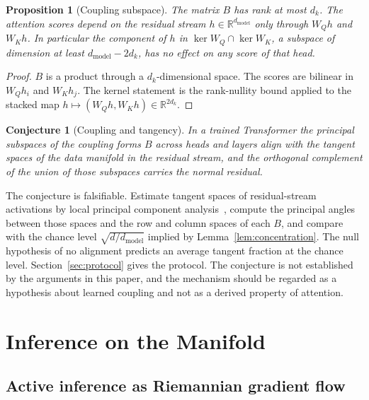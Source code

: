 \documentclass[11pt,a4paper]{article}
\newtheorem{proposition}[theorem]{Proposition}
\newtheorem{conjecture}[theorem]{Conjecture}
\theoremstyle{definition}
\theoremstyle{remark}
\newcommand{\R}{\mathbb{R}}
\begin{document}
\begin{proposition}[Coupling subspace]\label{prop:coupling}
The matrix $B$ has rank at most $d_k$. The attention scores depend on the
residual stream $h\in\R^{d_{\mathrm{model}}}$ only through
$W_Qh$ and $W_Kh$. In particular the component of $h$ in
$\ker W_Q\cap\ker W_K$, a subspace of dimension at least
$d_{\mathrm{model}}-2d_k$, has no effect on any score of that head.
\end{proposition}

\begin{proof}
$B$ is a product through a $d_k$-dimensional space. The scores are bilinear
in $W_Qh_i$ and $W_Kh_j$. The kernel statement is the rank-nullity bound
applied to the stacked map $h\mapsto(W_Qh,W_Kh)\in\R^{2d_k}$.
\end{proof}

\begin{conjecture}[Coupling and tangency]\label{conj:attention}
In a trained Transformer the principal subspaces of the coupling forms $B$
across heads and layers align with the tangent spaces of the data
manifold in the residual stream, and the orthogonal complement of the
union of those subspaces carries the normal residual.
\end{conjecture}

The conjecture is falsifiable. Estimate tangent spaces of residual-stream
activations by local principal component analysis~\cite{singer2012vector},
compute the principal angles between those spaces and the row and column
spaces of each $B$, and compare with the chance level
$\sqrt{d/d_{\mathrm{model}}}$ implied by Lemma~\ref{lem:concentration}. The
null hypothesis of no alignment predicts an average tangent fraction at the
chance level. Section~\ref{sec:protocol} gives the protocol. The
conjecture is not established by the arguments in this paper, and the
mechanism should be regarded as a hypothesis about learned coupling and not
as a derived property of attention.

\section{Inference on the Manifold}\label{sec:inference}

\subsection{Active inference as Riemannian gradient flow}
\end{document}
